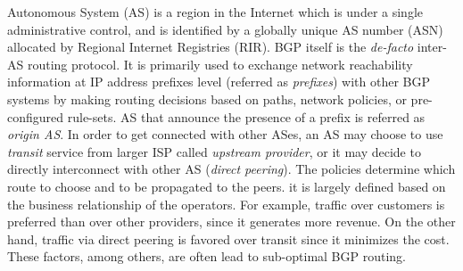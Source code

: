 


Autonomous System (AS) is a region in the Internet which is under a single administrative control, and is identified by a globally unique AS number (ASN) allocated by Regional Internet Registries (RIR). BGP  \cite{rfc4271} itself is the \textit{de-facto} inter-AS routing protocol. It is primarily used to exchange network reachability information at IP address prefixes level (referred as \textit{prefixes}) with other BGP systems by making routing decisions based on paths, network policies, or pre-configured rule-sets. AS that announce the presence of a prefix is referred as \textit{origin AS}. In order to get connected with other ASes, an AS may choose to use \textit{transit} service from larger ISP called \textit{upstream provider}, or it may decide to directly interconnect with other AS (\textit{direct peering}). The policies determine which route to choose and to be propagated to the peers. it is largely defined based on the business relationship of the operators. For example, traffic over customers is preferred than over other providers, since it generates more revenue. On the other hand, traffic via direct peering is favored over transit since it minimizes the cost. These factors, among others, are often lead to sub-optimal BGP routing.

